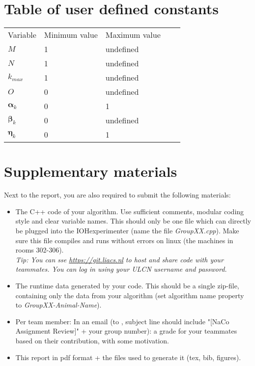 \documentclass[runningheads]{llncs}
\begin{document}
\section{Table of user defined constants}
\label{AppA}
\begin{table}[]
\begin{tabular}{|l|l|l|ll}
\cline{1-3}
Variable & Minimum value & Maximum value &  &  \\  \cline{1-3}
$M$  & 1   & undefined   &  &  \\  \cline{1-3}
$N$ & 1 & undefined & & \\ \cline{1-3}
$ k_{max} $ & 1 & undefined &  &  \\  \cline{1-3}
$ O $   & 0    & undefined &  &   \\  \cline{1-3}
$ \boldsymbol{\alpha}_k $ &  0 & 1 &  &  \\  \cline{1-3}
$ \boldsymbol{\beta}_k $ & 0 & undefined &  &  \\  \cline{1-3}
$ \boldsymbol{\eta}_k $ & 0 & 1 &  & \\  \cline{1-3}
\end{tabular}
\end{table}


\section{Supplementary materials}
Next to the report, you are also required to submit the following materials:
\begin{itemize}
    \item The C++ code of your algorithm. Use sufficient comments, modular coding style and clear variable names. This should only be one file which can directly be plugged into the IOHexperimenter (name the file \textit{GroupXX.cpp}). Make sure this file compiles and runs without errors on linux (the machines in rooms 302-306).\\
    \textit{Tip: You can sse \url{https://git.liacs.nl} to host and share code with your teammates. You can log in using your ULCN username and password.}
    \item The runtime data generated by your code. This should be a single zip-file, containing only the data from your algorithm (set algorithm name property to \textit{GroupXX-Animal-Name}).
    \item Per team member: In an email (to \href{mailto:d.l.vermetten@liacs.leidenuniv.nl}{}, subject line should include "[NaCo Assignment Review]" + your group number): a grade for your teammates based on their contribution, with some motivation. 
    \item This report in pdf format + the files used to generate it (tex, bib, figures). 
\end{itemize}
\end{document}
